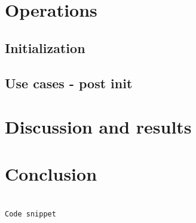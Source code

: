 \documentclass[conference]{IEEEtran}
\begin{document}
\section{Operations}

\subsection{Initialization}

\subsection{Use cases - post init}

\section{Discussion and results}

\section{Conclusion}






\begin{lstlisting}[basicstyle=\tiny,language=python,caption={Code}]

Code snippet
\end{lstlisting}
\end{document}
